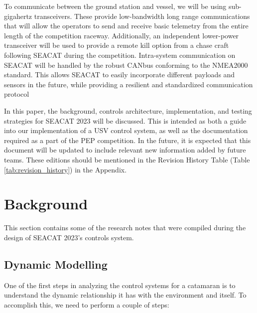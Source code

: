 To communicate between the ground station and vessel, we will be using sub-gigahertz transceivers.
These provide low-bandwidth long range communications that will allow the operators to send and receive basic telemetry from the entire length of the competition raceway.
Additionally, an independent lower-power transceiver will be used to provide a remote kill option from a chase craft following SEACAT during the competition.
Intra-system communication on SEACAT will be handled by the robust CANbus conforming to the NMEA2000 standard.
This allows SEACAT to easily incorporate different payloads and sensors in the future, while providing a resilient and standardized communication protocol

In this paper, the background, controls architecture, implementation, and testing strategies for SEACAT 2023 will be discussed.
This is intended as both a guide into our implementation of a USV control system, as well as the documentation required as a part of the PEP competition.
In the future, it is expected that this document will be updated to include relevant new information added by future teams.
These editions should be mentioned in the Revision History Table (Table \ref{tab:revision_history}) in the Appendix.

\section{Background} 
This section contains some of the research notes that were compiled during the design of SEACAT 2023's controls system.

\subsection{Dynamic Modelling}
One of the first steps in analyzing the control systems for a catamaran is to understand the dynamic relationship it has with the environment and itself.
To accomplish this, we need to perform a couple of steps:

